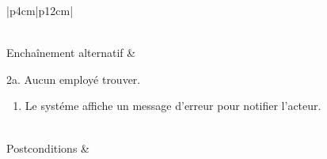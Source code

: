 \begin{longtable}{|p{4cm}|p{12cm}|}
\begin{minipage}[t]{\linewidth}
\begin{enumerate}[itemindent=0pt, leftmargin=*, nosep,after=\vspace{-\baselineskip},before=\vspace{-0.5\baselineskip}]
                    \end{enumerate}
                    \end{minipage}
                     \\
                    \hline
                    Enchaînement alternatif &  
                    \begin{minipage}[t]{\linewidth}
                        2a. Aucun employé trouver.
                        \begin{enumerate}[nosep,after=\strut]
                              \item Le systéme affiche un message d'erreur pour notifier l'acteur.
                        \end{enumerate}
                    \end{minipage}
                    \\
                    
                    \hline
                    Postconditions &   \\
                    \hline
                    \caption{Description du cas d'utilisation « Affectation d'un planning »}\\
            \end{longtable}

